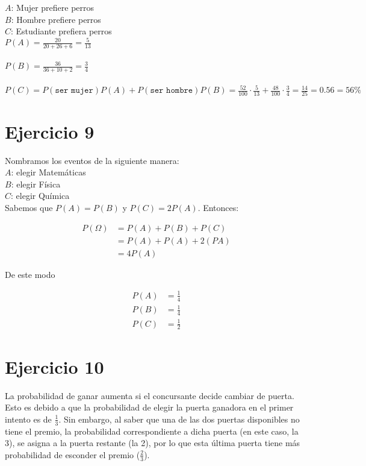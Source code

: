 \documentclass[letterpaper,12pt]{memoir}
\theoremstyle{definition}
\begin{document}
\(A\): Mujer prefiere perros\\
\(B\): Hombre prefiere perros\\
\(C\): Estudiante prefiera perros\\

\(P(A) = \frac{20}{20+26+6} = \frac{5}{13}\)\\\\
\(P(B) = \frac{36}{36+10+2} = \frac{3}{4}\)\\\\
\(P(C) = P(\texttt{ser mujer})P(A)+P(\texttt{ser hombre})P(B) = \frac{52}{100} \cdot \frac{5}{13} + \frac{48}{100} \cdot \frac{3}{4} = \frac{14}{25} = 0.56 = 56\%\)


\section*{Ejercicio 9}

Nombramos los eventos de la siguiente manera:\\

\(A\): elegir Matemáticas\\
\(B\): elegir Física\\
\(C\): elegir Química\\

Sabemos que \(P(A) = P(B)\) y \(P(C) = 2P(A)\). Entonces:

\begin{align*}
  P(\Omega)  & = P(A) + P(B) + P(C)\\
        &= P(A) + P(A) + 2(PA)\\
        &= 4P(A)
\end{align*}

De este modo

\begin{align*}
  P(A)  & = \frac{1}{4}\\
  P(B)  & = \frac{1}{4}\\
  P(C)  & = \frac{1}{2}
\end{align*}

\section*{Ejercicio 10}

La probabilidad de ganar aumenta si el concursante decide cambiar de puerta. Esto es debido a que la probabilidad de elegir la puerta ganadora en el primer intento es de \(\frac{1}{3}\). Sin embargo, al saber que una de las dos puertas disponibles no tiene el premio, la probabilidad correspondiente a dicha puerta (en este caso, la 3), se asigna a la puerta restante (la 2), por lo que esta última puerta tiene más probabilidad de esconder el premio (\(\frac{2}{3}\)).
\end{document}
